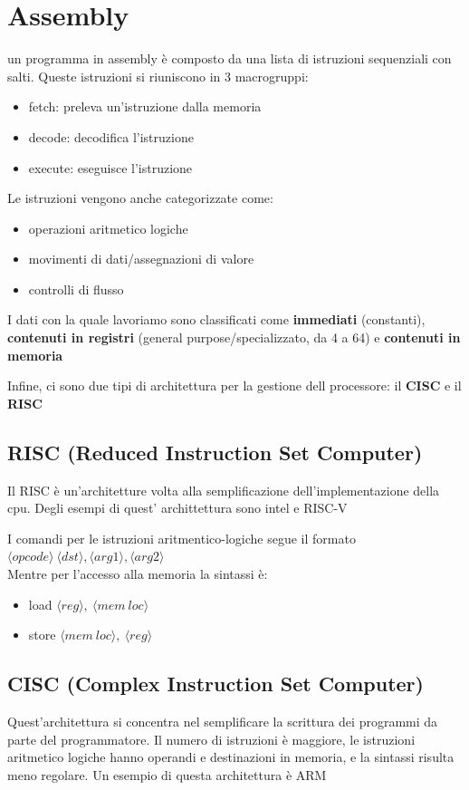 \documentclass[12pt, a4paper]{article}
\begin{document}
\newpage
\section{Assembly}
un programma in assembly è composto da una lista di istruzioni sequenziali con salti. Queste istruzioni si riuniscono
in 3 macrogruppi:
\begin{itemize}
  \item fetch: preleva un'istruzione dalla memoria
  \item decode: decodifica l'istruzione
  \item execute: eseguisce l'istruzione
\end{itemize}

Le istruzioni vengono anche categorizzate come:
\begin{itemize}
  \item operazioni aritmetico logiche
  \item movimenti di dati/assegnazioni di valore
  \item controlli di flusso
\end{itemize}

I dati con la quale lavoriamo sono classificati come \textbf{immediati} (constanti), \textbf{contenuti in registri}
(general purpose/specializzato, da 4 a 64) e \textbf{contenuti in memoria}

Infine, ci sono due tipi di architettura per la gestione dell processore: il \textbf{CISC} e il \textbf{RISC}

\subsection{RISC (Reduced Instruction Set Computer)}
Il RISC è un'architetture volta alla semplificazione dell'implementazione della cpu. Degli esempi di quest'
archittettura sono intel e RISC-V

I comandi per le istruzioni aritmentico-logiche segue il formato $\langle opcode\rangle\ 
\langle dst\rangle, \langle arg1\rangle, \langle arg2\rangle$\\
Mentre per l'accesso alla memoria la sintassi è:
\begin{itemize}
  \item load $\langle reg\rangle,\ \langle mem\ loc\rangle$
  \item store $\langle mem\ loc\rangle,\ \langle reg\rangle$
\end{itemize}



\subsection{CISC (Complex Instruction Set Computer)} 
Quest'architettura si concentra nel semplificare la scrittura dei programmi da parte del programmatore.
Il numero di istruzioni è maggiore, le istruzioni aritmetico logiche hanno operandi e destinazioni in 
memoria, e la sintassi risulta meno regolare.
Un esempio di questa architettura è ARM
\end{document}
